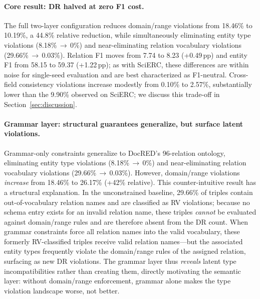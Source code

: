 \paragraph{Core result: DR halved at zero F1 cost.}
The full two-layer configuration reduces domain/range violations from
18.46\% to 10.19\%, a 44.8\% relative reduction, while simultaneously
eliminating entity type violations (8.18\%\,$\to$\,0\%) and
near-eliminating relation vocabulary violations
(29.66\%\,$\to$\,0.03\%).
Relation F1 moves from 7.74 to 8.23 (+0.49\,pp) and entity F1 from
58.15 to 59.37 (+1.22\,pp);
as with SciERC, these differences are within noise for single-seed
evaluation and are best characterized as F1-neutral.
Cross-field consistency violations increase modestly from 0.10\% to
2.57\%, substantially lower than the 9.90\% observed on SciERC;
we discuss this trade-off in Section~\ref{sec:discussion}.

\paragraph{Grammar layer: structural guarantees generalize, but surface latent violations.}
Grammar-only constraints generalize to DocRED's 96-relation ontology,
eliminating entity type violations (8.18\%\,$\to$\,0\%) and
near-eliminating relation vocabulary violations
(29.66\%\,$\to$\,0.03\%).
However, domain/range violations \emph{increase} from 18.46\% to
26.17\% (+42\% relative).
This counter-intuitive result has a structural explanation.
In the unconstrained baseline, 29.66\% of triples contain
out-of-vocabulary relation names and are classified as RV violations;
because no schema entry exists for an invalid relation name,
these triples \emph{cannot} be evaluated against domain/range rules
and are therefore absent from the DR count.
When grammar constraints force all relation names into the valid
vocabulary, these formerly RV-classified triples receive valid
relation names---but the associated entity types frequently violate
the domain/range rules of the assigned relation, surfacing as new
DR violations.
The grammar layer thus \emph{reveals} latent type incompatibilities
rather than creating them, directly motivating the semantic layer:
without domain/range enforcement, grammar alone makes the type
violation landscape worse, not better.

